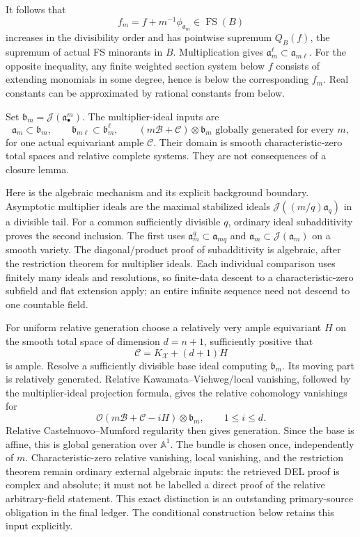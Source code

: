 \documentclass[
  10pt,
]{article}
\begin{document}
It follows that
\[f_m=f+m^{-1}\phi_{\mathfrak a_m}\in\operatorname{FS}(B)\] increases in
the divisibility order and has pointwise supremum \(Q_B(f)\), the
supremum of actual FS minorants in \(B\). Multiplication gives
\(\mathfrak a_m^\ell\subset\mathfrak a_{m\ell}\). For the opposite
inequality, any finite weighted section system below \(f\) consists of
extending monomials in some degree, hence is below the corresponding
\(f_m\). Real constants can be approximated by rational constants from
below.

Set \(\mathfrak b_m=\mathcal J(\mathfrak a_\bullet^m)\). The
multiplier-ideal inputs are \[\mathfrak a_m\subset\mathfrak b_m,
\qquad \mathfrak b_{m\ell}\subset\mathfrak b_m^\ell,
\qquad (m\mathcal B+\mathcal C)\otimes\mathfrak b_m
\text{ globally generated for every }m,\] for one actual equivariant
ample \(\mathcal C\). Their domain is smooth characteristic-zero total
spaces and relative complete systems. They are not consequences of a
closure lemma.

Here is the algebraic mechanism and its explicit background boundary.
Asymptotic multiplier ideals are the maximal stabilized ideals
\(\mathcal J((m/q)\mathfrak a_q)\) in a divisible tail. For a common
sufficiently divisible \(q\), ordinary ideal subadditivity proves the
second inclusion. The first uses
\(\mathfrak a_m^q\subset\mathfrak a_{mq}\) and
\(\mathfrak a_m\subset\mathcal J(\mathfrak a_m)\) on a smooth variety.
The diagonal/product proof of subadditivity is algebraic, after the
restriction theorem for multiplier ideals. Each individual comparison
uses finitely many ideals and resolutions, so finite-data descent to a
characteristic-zero subfield and flat extension apply; an entire
infinite sequence need not descend to one countable field.

For uniform relative generation choose a relatively very ample
equivariant \(H\) on the smooth total space of dimension \(d=n+1\),
sufficiently positive that \[\mathcal C=K_{\mathcal X}+(d+1)H\] is
ample. Resolve a sufficiently divisible base ideal computing
\(\mathfrak b_m\). Its moving part is relatively generated. Relative
Kawamata--Viehweg/local vanishing, followed by the multiplier-ideal
projection formula, gives the relative cohomology vanishings for
\[\mathcal O(m\mathcal B+\mathcal C-iH)\otimes\mathfrak b_m,
\qquad 1\leq i\leq d.\] Relative Castelnuovo--Mumford regularity then
gives generation. Since the base is affine, this is global generation
over \(\mathbb A^1\). The bundle is chosen once, independently of \(m\).
Characteristic-zero relative vanishing, local vanishing, and the
restriction theorem remain ordinary external algebraic inputs: the
retrieved DEL proof is complex and absolute; it must not be labelled a
direct proof of the relative arbitrary-field statement. This exact
distinction is an outstanding primary-source obligation in the final
ledger. The conditional construction below retains this input
explicitly.
\end{document}
